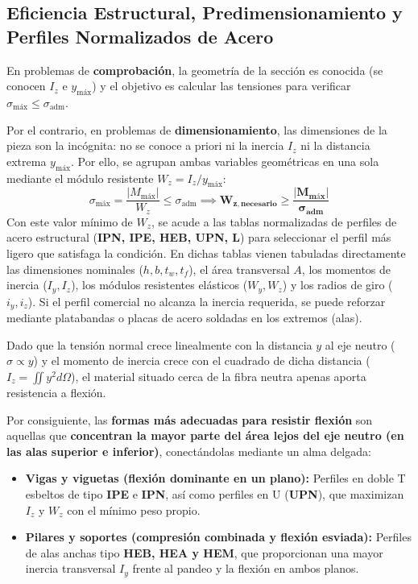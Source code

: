 \subsection{Eficiencia Estructural, Predimensionamiento y Perfiles Normalizados de Acero}

En problemas de \textbf{comprobación}, la geometría de la sección es conocida (se conocen $I_z$ e $y_{\text{máx}}$) y el objetivo es calcular las tensiones para verificar $\sigma_{\text{máx}} \le \sigma_{\text{adm}}$.

Por el contrario, en problemas de \textbf{dimensionamiento}, las dimensiones de la pieza son la incógnita: no se conoce a priori ni la inercia $I_z$ ni la distancia extrema $y_{\text{máx}}$. Por ello, se agrupan ambas variables geométricas en una sola mediante el módulo resistente $W_z = I_z / y_{\text{máx}}$:
\begin{equation}
    \sigma_{\text{máx}} = \frac{|M_{\text{máx}}|}{W_z} \le \sigma_{\text{adm}} \implies \mathbf{W_{z,\text{necesario}} \ge \frac{|M_{\text{máx}}|}{\sigma_{\text{adm}}}}
\end{equation}
Con este valor mínimo de $W_z$, se acude a las tablas normalizadas de perfiles de acero estructural (\textbf{IPN, IPE, HEB, UPN, L}) para seleccionar el perfil más ligero que satisfaga la condición. En dichas tablas vienen tabuladas directamente las dimensiones nominales ($h, b, t_w, t_f$), el área transversal $A$, los momentos de inercia ($I_y, I_z$), los módulos resistentes elásticos ($W_y, W_z$) y los radios de giro ($i_y, i_z$). Si el perfil comercial no alcanza la inercia requerida, se puede reforzar mediante platabandas o placas de acero soldadas en los extremos (alas).

Dado que la tensión normal crece linealmente con la distancia $y$ al eje neutro ($\sigma \propto y$) y el momento de inercia crece con el cuadrado de dicha distancia ($I_z = \iint y^2 d\Omega$), el material situado cerca de la fibra neutra apenas aporta resistencia a flexión.

Por consiguiente, las \textbf{formas más adecuadas para resistir flexión} son aquellas que \textbf{concentran la mayor parte del área lejos del eje neutro (en las alas superior e inferior)}, conectándolas mediante un alma delgada:
\begin{itemize}
    \item \textbf{Vigas y viguetas (flexión dominante en un plano):} Perfiles en doble T esbeltos de tipo \textbf{IPE} e \textbf{IPN}, así como perfiles en U (\textbf{UPN}), que maximizan $I_z$ y $W_z$ con el mínimo peso propio.
    \item \textbf{Pilares y soportes (compresión combinada y flexión esviada):} Perfiles de alas anchas tipo \textbf{HEB, HEA y HEM}, que proporcionan una mayor inercia transversal $I_y$ frente al pandeo y la flexión en ambos planos.
\end{itemize}

